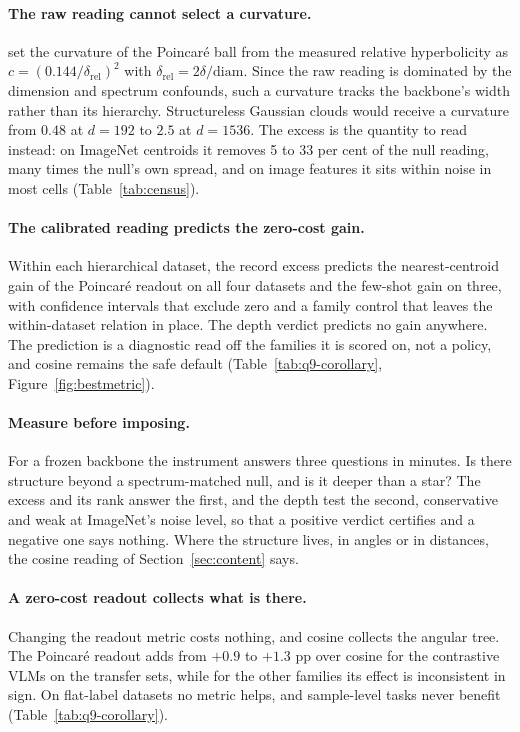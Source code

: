 \documentclass{article}
\begin{document}
\paragraph{The raw reading cannot select a curvature.} \citet{Khrulkov_2020_CVPR} set the curvature of the Poincar\'{e} ball from the measured relative hyperbolicity as $c=(0.144/\delta_{\text{rel}})^2$ with $\delta_{\text{rel}}=2\delta/\mathrm{diam}$. Since the raw reading is dominated by the dimension and spectrum confounds, such a curvature tracks the backbone's width rather than its hierarchy. Structureless Gaussian clouds would receive a curvature from $0.48$ at $d{=}192$ to $2.5$ at $d{=}1536$. The excess is the quantity to read instead: on ImageNet centroids it removes 5 to 33 per cent of the null reading, many times the null's own spread, and on image features it sits within noise in most cells (Table~\ref{tab:census}). %

\paragraph{The calibrated reading predicts the zero-cost gain.} Within each hierarchical dataset, the record excess predicts the nearest-centroid gain of the Poincar\'{e} readout on all four datasets and the few-shot gain on three, with confidence intervals that exclude zero and a family control that leaves the within-dataset relation in place. The depth verdict predicts no gain anywhere. The prediction is a diagnostic read off the families it is scored on, not a policy, and cosine remains the safe default (Table~\ref{tab:q9-corollary}, Figure~\ref{fig:bestmetric}). %

\paragraph{Measure before imposing.} For a frozen backbone the instrument answers three questions in minutes. Is there structure beyond a spectrum-matched null, and is it deeper than a star? The excess and its rank answer the first, and the depth test the second, conservative and weak at ImageNet's noise level, so that a positive verdict certifies and a negative one says nothing. Where the structure lives, in angles or in distances, the cosine reading of Section~\ref{sec:content} says.

\paragraph{A zero-cost readout collects what is there.} Changing the readout metric costs nothing, and cosine collects the angular tree. The Poincar\'{e} readout adds from $+0.9$ to $+1.3$ pp over cosine for the contrastive VLMs on the transfer sets, while for the other families its effect is inconsistent in sign. On flat-label datasets no metric helps, and sample-level tasks never benefit (Table~\ref{tab:q9-corollary}). %
\end{document}

